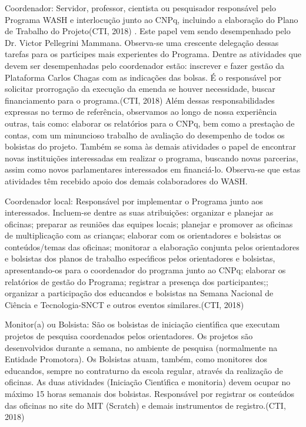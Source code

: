 \documentclass[
12pt,		%
openright,	%
twoside,  %
a4paper,			%
chapter=TITLE,		%
english,			%
french,				%
spanish,			%
brazil				%
]{USPSC-classe/USPSC}
\begin{document}
\begin{alineas}
\item Coordenador: \textquotedbl Servidor, professor, cientista ou pesquisador respons\'avel pelo Programa WASH e interlocu\c{c}\~ao junto ao CNPq, incluindo a elabora\c{c}\~ao do Plano de Trabalho do Projeto\textquotedbl   (CTI, 2018) . Este papel vem sendo desempenhado pelo Dr. Victor Pellegrini Mammana. Observa-se uma crescente delega\c{c}\~ao dessas tarefas para os part\'{\i}cipes mais experientes do Programa. Dentre as atividades que devem ser desempenhadas pelo coordenador est\~ao: \textquotedbl inscrever e fazer gest\~ao da Plataforma Carlos Chagas com as indica\c{c}\~oes das bolsas. \'E o respons\'avel por solicitar prorroga\c{c}\~ao da execu\c{c}\~ao da emenda se houver necessidade, buscar financiamento para o programa.\textquotedbl   (CTI, 2018) Al\'em dessas responsabilidades expressas no termo de refer\^encia, observamos ao longo de nossa experi\^encia outras, tais como: elaborar os relat\'orios para o CNPq, bem como a presta\c{c}\`ao de contas, com um minuncioso trabalho de avalia\c{c}\~ao do desempenho de todos os bolsistas do projeto. Tamb\'em se soma \`as demais atividades o papel de encontrar novas institui\c{c}\~oes interessadas em realizar o programa, buscando novas parcerias, assim como novos parlamentares interessados em financi\'a-lo. Observa-se que estas atividades t\^em recebido apoio dos demais colaboradores do WASH.
\item Coordenador local: \textquotedbl Respons\'avel por implementar o Programa junto aos interessados. Incluem-se dentre as suas atribui\c{c}\~oes: organizar e planejar as oficinas; preparar as reuni\~oes das equipes locais; planejar e promover as oficinas de multiplica\c{c}\~ao com as crian\c{c}as; elaborar com os orientadores e bolsistas os conte\'udos/temas das oficinas; monitorar a elabora\c{c}\~ao conjunta pelos orientadores e bolsistas dos planos de trabalho espec\'{\i}ficos pelos orientadores e bolsistas, apresentando-os para o coordenador do programa junto ao CNPq; elaborar os relat\'orios de gest\~ao do Programa; registrar a presen\c{c}a dos participantes;; organizar a participa\c{c}\~ao dos educandos e bolsistas na Semana Nacional de Ci\^encia e Tecnologia-SNCT e outros eventos similares.\textquotedbl   (CTI, 2018)
\item Monitor(a) ou Bolsista: \textquotedbl S\~ao os bolsistas de inicia\c{c}\~ao cient\'{\i}fica que executam projetos de pesquisa coordenados pelos orientadores. Os projetos s\~ao desenvolvidos durante a semana, no ambiente de pesquisa (normalmente na Entidade Promotora). Os Bolsistas atuam, tamb\'em, como monitores dos educandos, sempre no contraturno da escola regular, atrav\'es da realiza\c{c}\~ao de oficinas. As duas atividades (Inicia\c{c}\~ao Cient\'{\i}fica e monitoria) devem ocupar no m\'aximo 15 horas semanais dos bolsistas. Respons\'avel por registrar os conte\'udos das oficinas no site do MIT (Scratch) e demais instrumentos de registro.\textquotedbl   (CTI, 2018)

\end{alineas}
\end{document}
